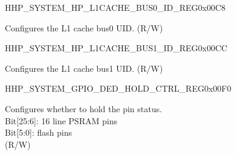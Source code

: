 \begin{register}{H}{HP\_SYSTEM\_HP\_L1CACHE\_BUS0\_ID\_REG}{0x00C8}\label{regdesc:HPSYSTEMHPL1CACHEBUS0IDREG}
%
%
\regnewline%
\begin{regdesc}\begin{reglist}
\label{fielddesc:HPSYSTEML1CACHEBUS0ID}\item [HP\_SYSTEM\_L1\_CACHE\_BUS0\_ID] Configures the L1 cache bus0 UID. (R/W)
\end{reglist}\end{regdesc}
\end{register}


\begin{register}{H}{HP\_SYSTEM\_HP\_L1CACHE\_BUS1\_ID\_REG}{0x00CC}\label{regdesc:HPSYSTEMHPL1CACHEBUS1IDREG}
%
%
\regnewline%
\begin{regdesc}\begin{reglist}
\label{fielddesc:HPSYSTEML1CACHEBUS1ID}\item [HP\_SYSTEM\_L1\_CACHE\_BUS1\_ID] Configures the L1 cache bus1 UID. (R/W)
\end{reglist}\end{regdesc}
\end{register}


\begin{register}{H}{HP\_SYSTEM\_GPIO\_DED\_HOLD\_CTRL\_REG}{0x00F0}\label{regdesc:HPSYSTEMGPIODEDHOLDCTRLREG}
%
%
\regnewline%
\begin{regdesc}\begin{reglist}
\label{fielddesc:HPSYSTEMGPIODEDHOLD}\item [HP\_SYSTEM\_GPIO\_DED\_HOLD] Configures whether to hold the pin status.\\
Bit[25:6]: 16 line PSRAM pins\\
Bit[5:0]: flash pins\\
(R/W)
\end{reglist}\end{regdesc}
\end{register}


